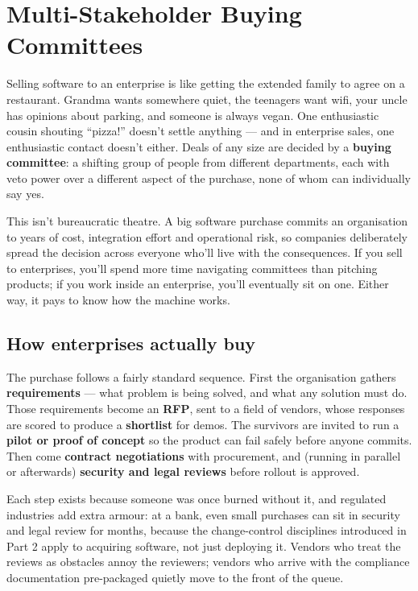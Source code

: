 \section{Multi-Stakeholder Buying Committees}
Selling software to an enterprise is like getting the extended family to agree on a restaurant. Grandma wants somewhere quiet, the teenagers want wifi, your uncle has opinions about parking, and someone is always vegan. One enthusiastic cousin shouting ``pizza!'' doesn't settle anything — and in enterprise sales, one enthusiastic contact doesn't either. Deals of any size are decided by a \textbf{buying committee}: a shifting group of people from different departments, each with veto power over a different aspect of the purchase, none of whom can individually say yes.


This isn't bureaucratic theatre. A big software purchase commits an organisation to years of cost, integration effort and operational risk, so companies deliberately spread the decision across everyone who'll live with the consequences. If you sell to enterprises, you'll spend more time navigating committees than pitching products; if you work inside an enterprise, you'll eventually sit on one. Either way, it pays to know how the machine works.



\subsection{How enterprises actually buy}


The purchase follows a fairly standard sequence. First the organisation gathers \textbf{requirements} — what problem is being solved, and what any solution must do. Those requirements become an \textbf{RFP}, sent to a field of vendors, whose responses are scored to produce a \textbf{shortlist} for demos. The survivors are invited to run a \textbf{pilot or proof of concept} so the product can fail safely before anyone commits. Then come \textbf{contract negotiations} with procurement, and (running in parallel or afterwards) \textbf{security and legal reviews} before rollout is approved.


Each step exists because someone was once burned without it, and regulated industries add extra armour: at a bank, even small purchases can sit in security and legal review for months, because the change-control disciplines introduced in Part 2 apply to acquiring software, not just deploying it. Vendors who treat the reviews as obstacles annoy the reviewers; vendors who arrive with the compliance documentation pre-packaged quietly move to the front of the queue.



